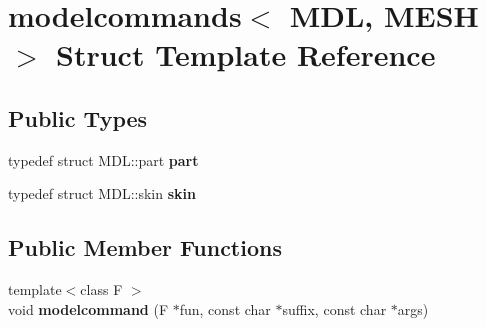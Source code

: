 \hypertarget{structmodelcommands}{}\section{modelcommands$<$ M\+DL, M\+E\+SH $>$ Struct Template Reference}
\label{structmodelcommands}
\subsection*{Public Types}
\begin{DoxyCompactItemize}
\item 
\mbox{\label{structmodelcommands_ad9345d16a41aae327dd15031ee1b273d}} 
typedef struct M\+D\+L\+::part {\bfseries part}
\item 
\mbox{\label{structmodelcommands_a1f65de09b1b75ae1bcda14fdd82b8c17}} 
typedef struct M\+D\+L\+::skin {\bfseries skin}
\end{DoxyCompactItemize}
\subsection*{Public Member Functions}
\begin{DoxyCompactItemize}
\item 
\mbox{\label{structmodelcommands_a2c72267d29e00af38ea509970eb7fac1}} 
{\footnotesize template$<$class F $>$ }\\void {\bfseries modelcommand} (F $\ast$fun, const char $\ast$suffix, const char $\ast$args)
\end{DoxyCompactItemize}
